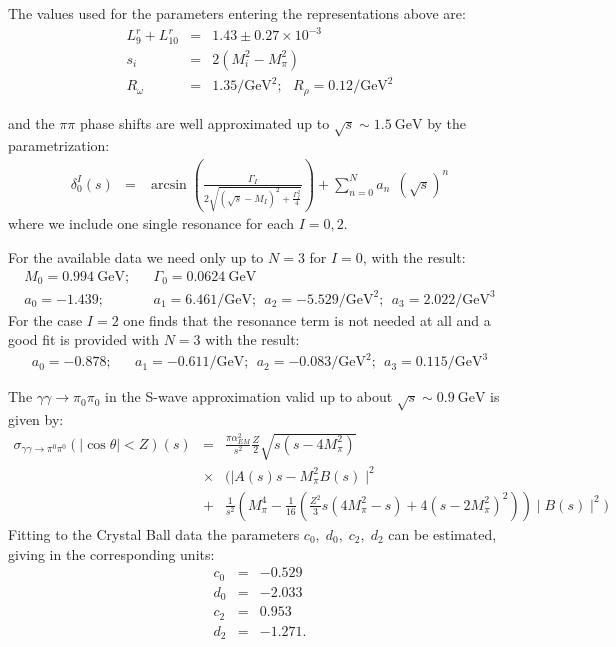 \documentclass[12pt]{article}
\newcommand{\bea}{\begin{eqnarray}}
\newcommand{\eea}{\end{eqnarray}}
\begin{document}
The values used for the parameters entering the representations above are:
\bea
L_9^r+L_{10}^r&=&1.43\pm 0.27\times 10^{-3}\nonumber\\
s_i&=&2 (M_i^2-M_\pi^2)\nonumber\\
R_\omega&=& 1.35/\mathrm{GeV}^2;~~~R_\rho=0.12/\mathrm{GeV}^2
\eea

and the $\pi\pi$ phase shifts are well approximated up to $\sqrt{s}\sim 1.5~\mathrm{GeV}$ by the parametrization:
\bea
\delta_0^I(s)&=& \arcsin\left(\frac{\Gamma_I}{2\sqrt{(\sqrt{s} - M_I)^2 +\frac{ \Gamma_I^2}{4}}}\right)+\sum_{n=0}^N a_n\;\, (\sqrt{s})^n
\eea
where we include one single resonance for each $I=0,2$.

For the available data we need only up to $N=3$ for $I=0$, with the result:
\bea
M_0=0.994~\mathrm{GeV};&&\Gamma_0=0.0624~\mathrm{GeV}\nonumber\\
a_0=-1.439;&&a_1=6.461 /\mathrm{GeV};~~a_2=-5.529 /\mathrm{GeV}^2;~~a_3=2.022 /\mathrm{GeV}^3
\eea
For the case $I=2$ one finds that   the resonance term is not needed at all and a good fit is provided with $N=3$ with the result:
\bea
a_0=-0.878;&&a_1=-0.611 /\mathrm{GeV};~~a_2=-0.083 /\mathrm{GeV}^2;~~a_3=0.115 /\mathrm{GeV}^3
\eea


The $\gamma\gamma\to\pi_0\pi_0$ in the S-wave approximation
valid up to about $\sqrt{s}\sim 0.9~\mathrm{GeV}$ is given by:
\bea
\sigma_{\gamma\gamma\to\pi^0\pi^0}(|\cos \theta|<Z)(s)&=&\frac{\pi \alpha_{EM}^2}{s^2}
\frac Z2  \sqrt{s (s -4 M_\pi^2)} \\
&\times&(\mid A(s) s-M_\pi^2  B(s)\mid^2\nonumber\\
&+&\frac {1}{s^2} \left(M_\pi^4- \frac{1}{16}(\frac{Z^2}{3} s(4 M_\pi^2-s)+4(s-2 M_\pi^2)^2)\right)\mid B(s)\mid ^2) \nonumber
\eea
 Fitting to the Crystal Ball data \cite{Marsiske:1990h} the parameters $c_0,\;d_0,\;c_2,\;d_2$ can be estimated,  giving in the corresponding units: 
\bea
c_0&=& -0.529 \nonumber\\
d_0&=&-2.033 \nonumber\\
c_2&=& 0.953\nonumber\\
d_2&=& -1.271.
\eea


 
\end{document}
